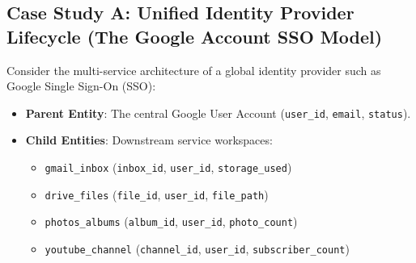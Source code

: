 \documentclass[10pt,journal,compsoc,onecolumn]{IEEEtran}
\begin{document}
\subsection{Case Study A: Unified Identity Provider Lifecycle (The Google Account SSO Model)}
Consider the multi-service architecture of a global identity provider such as Google Single Sign-On (SSO):
\begin{itemize}
    \item \textbf{Parent Entity}: The central Google User Account (\texttt{user\_id}, \texttt{email}, \texttt{status}).
    \item \textbf{Child Entities}: Downstream service workspaces:
    \begin{itemize}
        \item \texttt{gmail\_inbox} (\texttt{inbox\_id}, \texttt{user\_id}, \texttt{storage\_used})
        \item \texttt{drive\_files} (\texttt{file\_id}, \texttt{user\_id}, \texttt{file\_path})
        \item \texttt{photos\_albums} (\texttt{album\_id}, \texttt{user\_id}, \texttt{photo\_count})
        \item \texttt{youtube\_channel} (\texttt{channel\_id}, \texttt{user\_id}, \texttt{subscriber\_count})
    \end{itemize}
\end{itemize}
\end{document}

